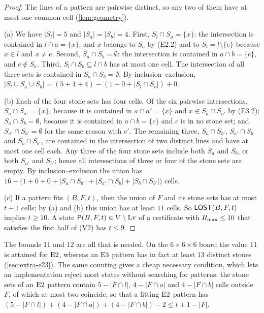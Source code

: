 \begin{proof}
The lines of a pattern are pairwise distinct, so any two of them have at most one common cell
(\cref{lem:geometry}).

(a) We have $|S_l|=5$ and $|S_a|=|S_b|=4$. First, $S_l\cap S_a=\{x\}$: the intersection is contained in
$l\cap a=\{x\}$, and $x$ belongs to $S_a$ by (E2.2) and to $S_l=l\setminus\{e\}$ because $x\in l$
and $x\ne e$. Second, $S_a\cap S_b=\emptyset$: the intersection is contained in $a\cap b=\{c\}$, and
$c\notin S_a$. Third, $S_l\cap S_b\subseteq l\cap b$ has at most one cell. The intersection of all three
sets is contained in $S_a\cap S_b=\emptyset$. By inclusion--exclusion,
$|S_l\cup S_a\cup S_b|=(5+4+4)-(1+0+|S_l\cap S_b|)+0$.

(b) Each of the four stone sets has four cells. Of the six pairwise intersections, $S_a\cap S_{a'}=\{x\}$,
because it is contained in $a\cap a'=\{x\}$ and $x\in S_a\cap S_{a'}$ by (E3.2); $S_a\cap S_b=\emptyset$,
because it is contained in $a\cap b=\{c\}$ and $c$ is in no stone set; and $S_{a'}\cap S_{b'}=\emptyset$ for the
same reason with $c'$. The remaining three, $S_a\cap S_{b'}$, $S_{a'}\cap S_b$ and $S_b\cap S_{b'}$, are
contained in the intersection of two distinct lines and have at most one cell each. Any three of the four
stone sets include both $S_a$ and $S_b$, or both $S_{a'}$ and $S_{b'}$; hence all intersections of three or
four of the stone sets are empty. By inclusion--exclusion the union has
$16-\bigl(1+0+0+|S_a\cap S_{b'}|+|S_{a'}\cap S_b|+|S_b\cap S_{b'}|\bigr)$ cells.

(c) If a pattern fits $(B,F,t)$, then the union of $F$ and its stone sets has at most $t+1$ cells; by (a)
and (b) this union has at least $11$ cells. So $\mathsf{LOST}(B,F,t)$ implies $t\ge 10$. A state
$\mathsf{P}(B,F,t)\in V\setminus\mathrm{Lv}$ of a certificate with $R_{\max}\le 10$ that satisfies the first half of (V2) has
$t\le 9$.
\end{proof}

The bounds $11$ and $12$ are all that is needed. On the $6\times6\times6$ board the value $11$ is attained
for $\mathrm{E2}$, whereas an $\mathrm{E3}$ pattern has in fact at least $13$ distinct stones
(\cref{sec:extra-e23}). The same counting gives a cheap necessary condition, which lets an
implementation reject most states without searching for patterns: the stone sets of an $\mathrm{E2}$ pattern
contain $5-|F\cap l|$, $4-|F\cap a|$ and $4-|F\cap b|$ cells outside $F$, of which at most two coincide, so
that a fitting $\mathrm{E2}$ pattern has
$(5-|F\cap l|)+(4-|F\cap a|)+(4-|F\cap b|)-2\le t+1-|F|$.

